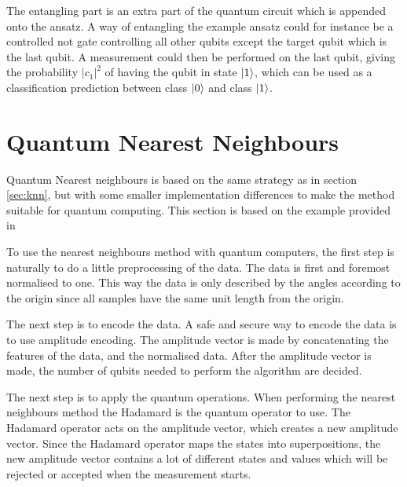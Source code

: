\documentclass[../main.tex]{subfiles}
\begin{document}
The entangling part is an extra part of the quantum circuit which is appended onto the ansatz. A way of entangling the example ansatz could for instance be a controlled not gate controlling all other qubits except the target qubit which is the last qubit. A measurement could then be performed on the last qubit, giving the probability \ensuremath{|c_1|^2} of having the qubit in state \ensuremath{\ket{1}}, which can be used as a classification prediction between class \ensuremath{\ket{0}} and class \ensuremath{\ket{1}}.

\section{Quantum Nearest Neighbours}
\label{sec:qnn}
Quantum Nearest neighbours is based on the same strategy as in section \ref{sec:knn}, but with some smaller implementation differences to make the method suitable for quantum computing. This section is based on the example provided in \cite[ch.~1]{10.5555/3309066}

To use the nearest neighbours method with quantum computers, the first step is naturally to do a little preprocessing of the data. The data is first and foremost normalised to one. This way the data is only described by the angles according to the origin since all samples have the same unit length from the origin.

The next step is to encode the data. A safe and secure way to encode the data is to use amplitude encoding. The amplitude vector is made by concatenating the features of the data, and the normalised data. After the amplitude vector is made, the number of qubits needed to perform the algorithm are decided.

The next step is to apply the quantum operations. When performing the nearest neighbours method the Hadamard is the quantum operator to use. The Hadamard operator acts on the amplitude vector, which creates a new amplitude vector. Since the Hadamard operator maps the states into superpositions, the new amplitude vector contains a lot of different states and values which will be rejected or accepted when the measurement starts.
\end{document}
